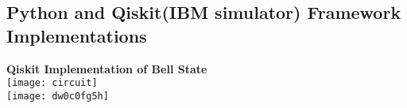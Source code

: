 \documentclass[12pt]{report}
\begin{document}
\begin{appendices} 
\chapter{Python and Qiskit(IBM simulator) Framework Implementations}
\newpage

 




\textbf{Qiskit Implementation of Bell State} \\
\texttt{[image: circuit]} \\
\texttt{[image: dw0c0fg5h]}








\end{appendices}
\end{document}
